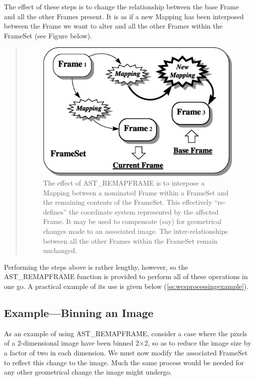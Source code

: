 \documentclass[twoside,11pt]{article}
\newcommand{\htmlref}[2]{#1}
\newcommand{\secref}[1]{\S\ref{#1}}
\renewcommand{\secref}[1]{\ref{#1}}
\begin{document}
\begin{htmlonly}
   The effect of these steps is to change the relationship between the
   base Frame and all the other Frames present. It is as if a new Mapping
   has been interposed between the Frame we want to alter and all the
   other Frames within the FrameSet (see Figure below).
   \begin{quote}
   \begin{figure}[hbtp]
   \label{fig:fsremap}
   \includegraphics[scale=0.9]{sun210_figures/fsremap.eps}
   \caption{The effect of AST\_REMAPFRAME is to interpose a Mapping between
   a nominated Frame within a FrameSet and the remaining contents of the
   FrameSet. This effectively ``re-defines'' the coordinate system
   represented by the affected Frame. It may be used to compensate (say)
   for geometrical changes made to an associated image. The
   inter-relationships between all the other Frames within the FrameSet
   remain unchanged.}
   \end{figure}
   \end{quote}
\end{htmlonly}

Performing the steps above is rather lengthy, however, so the
AST\_REMAPFRAME function is provided to perform all of these
operations in one go.  A practical example of its use is given below
(\secref{ss:wcsprocessingexample}).

\subsection{\label{ss:wcsprocessingexample}Example---Binning an Image}

As an example of using \htmlref{AST\_REMAPFRAME}{AST_REMAPFRAME}, consider a case where the
pixels of a 2-dimensional image have been binned 2$\times$2, so as to
reduce the image size by a factor of two in each dimension.  We must
now modify the associated \htmlref{FrameSet}{FrameSet} to reflect this change to the
image. Much the same process would be needed for any other geometrical
change the image might undergo.
\end{document}
